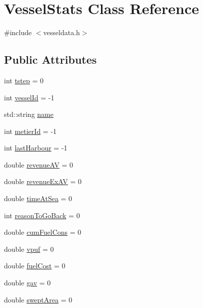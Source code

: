 \hypertarget{class_vessel_stats}{}\section{Vessel\+Stats Class Reference}
\label{class_vessel_stats}


{\ttfamily \#include $<$vesseldata.\+h$>$}

\subsection*{Public Attributes}
\begin{DoxyCompactItemize}
\item 
int \mbox{\hyperlink{class_vessel_stats_a73b68736d9bbf376a95960072f732a08}{tstep}} = 0
\item 
int \mbox{\hyperlink{class_vessel_stats_a4cf09d1d695be42fef60a8dd571122f6}{vessel\+Id}} = -\/1
\item 
std\+::string \mbox{\hyperlink{class_vessel_stats_ab884ab4f41d642bc2333483a8b20e749}{name}}
\item 
int \mbox{\hyperlink{class_vessel_stats_ac88801a8d23a6b6424e88fb8f490dbed}{metier\+Id}} = -\/1
\item 
int \mbox{\hyperlink{class_vessel_stats_a743282700bb89d2bb208fae081d66fe6}{last\+Harbour}} = -\/1
\item 
double \mbox{\hyperlink{class_vessel_stats_ada967b60bd4b0172f4321c412bd9e38c}{revenue\+AV}} = 0
\item 
double \mbox{\hyperlink{class_vessel_stats_a798e26b9ef64f80b02886c28274d5a76}{revenue\+Ex\+AV}} = 0
\item 
double \mbox{\hyperlink{class_vessel_stats_ad876731951dd4dc84c02db2202a9edf0}{time\+At\+Sea}} = 0
\item 
int \mbox{\hyperlink{class_vessel_stats_a6a62a0f745b7bd03498a555fdb1ae8c6}{reason\+To\+Go\+Back}} = 0
\item 
double \mbox{\hyperlink{class_vessel_stats_a553ba8d3ee6334541027a162f41f0917}{cum\+Fuel\+Cons}} = 0
\item 
double \mbox{\hyperlink{class_vessel_stats_abaef163246979850ccc4cc63b7e24250}{vpuf}} = 0
\item 
double \mbox{\hyperlink{class_vessel_stats_a0cd584828c0798f11aad1b5607a38a10}{fuel\+Cost}} = 0
\item 
double \mbox{\hyperlink{class_vessel_stats_ae28f66ff4d14da157a91d529e41cd853}{gav}} = 0
\item 
double \mbox{\hyperlink{class_vessel_stats_ab5a4c19f59ff3894e6ee9334d0b573f6}{swept\+Area}} = 0

\end{DoxyCompactItemize}
